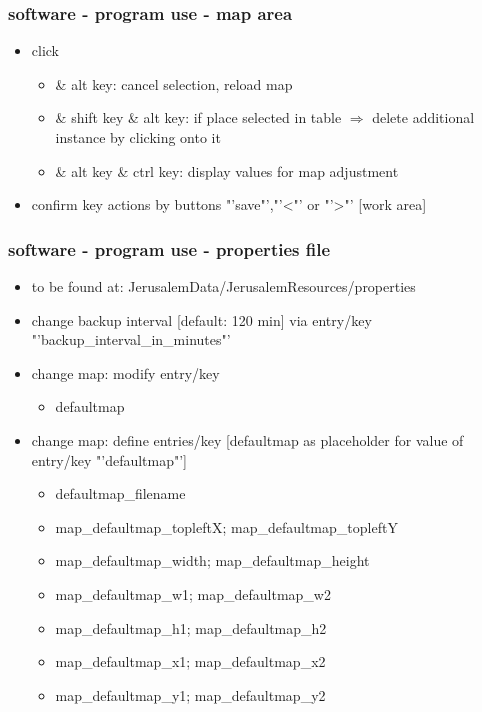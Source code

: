 \documentclass{beamer}
\begin{document}
	\begin{frame}
			\frametitle{software - program use - map area} 
				\begin{itemize}	
					\item click
					\begin{itemize}
							\item \& alt key: cancel selection, reload map
							\item \& shift key \& alt key: if place selected in table $\Rightarrow$ delete additional instance by clicking onto it
 							\item \& alt key \& ctrl key: display values for map adjustment
					\end{itemize}
					\item confirm key actions by buttons "'save"',"'\textless"' or "'\textgreater"' [work area] 
				\end{itemize}
	\end{frame}
	
	\begin{frame}
			\frametitle{software - program use - properties file} 
				\begin{itemize}	
					\item to be found at: JerusalemData/JerusalemResources/properties
					\item change backup interval [default: 120 min] via entry/key "'backup\_interval\_in\_minutes"'
					\item change map: modify entry/key
					\begin{itemize}
						\item defaultmap
					\end{itemize}
					\item change map: define entries/key [defaultmap as placeholder for value of entry/key "'defaultmap"']
					\begin{itemize}
						\item defaultmap\_filename
						\item map\_defaultmap\_topleftX; map\_defaultmap\_topleftY
						\item map\_defaultmap\_width; map\_defaultmap\_height
						\item map\_defaultmap\_w1; map\_defaultmap\_w2
						\item map\_defaultmap\_h1; map\_defaultmap\_h2
						\item map\_defaultmap\_x1; map\_defaultmap\_x2 
						\item map\_defaultmap\_y1; map\_defaultmap\_y2
					\end{itemize}
				\end{itemize}
	\end{frame}	
	
\end{document}
